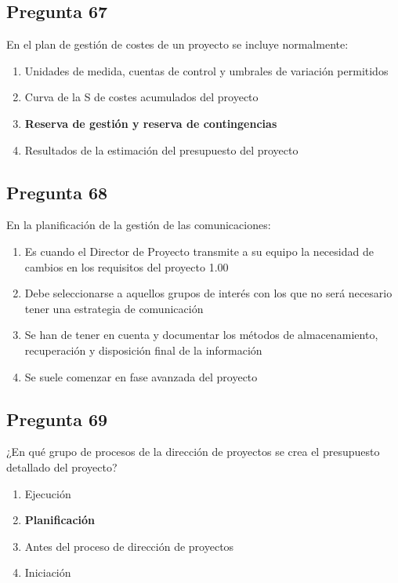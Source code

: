 \documentclass[11pt,a4paper]{article}
\begin{document}
\subsection*{Pregunta 67}
En el plan de gestión de costes de un proyecto se incluye normalmente:

\begin{enumerate}[label=\alph*)]
  \item Unidades de medida, cuentas de control y umbrales de variación permitidos
  \item Curva de la S de costes acumulados del proyecto
  \item \textbf{Reserva de gestión y reserva de contingencias}
  \item Resultados de la estimación del presupuesto del proyecto
\end{enumerate}

\subsection*{Pregunta 68}
En la planificación de la gestión de las comunicaciones:

\begin{enumerate}[label=\alph*)]
  \item Es cuando el Director de Proyecto transmite a su equipo la necesidad de cambios en los requisitos del proyecto 1.00
  \item Debe seleccionarse a aquellos grupos de interés con los que no será necesario tener una estrategia de comunicación
  \item Se han de tener en cuenta y documentar los métodos de almacenamiento, recuperación y disposición final de la información
  \item Se suele comenzar en fase avanzada del proyecto
\end{enumerate}

\subsection*{Pregunta 69}
¿En qué grupo de procesos de la dirección de proyectos se crea el presupuesto detallado del proyecto?

\begin{enumerate}[label=\alph*)]
  \item Ejecución
  \item \textbf{Planificación}
  \item Antes del proceso de dirección de proyectos
  \item Iniciación
\end{enumerate}
\end{document}
